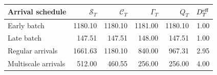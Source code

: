 \begin{tabular}{lrrrrr}
\toprule
Arrival schedule & $\mathscr S_T$ & $\mathscr C_T$ & $\Gamma_T$ & $Q_T$ & $D_T^{\rm eff}$ \\
\midrule
Early batch & 1180.10 & 1180.10 & 1181.00 & 1180.10 & 1.00 \\
Late batch & 147.51 & 147.51 & 148.00 & 147.51 & 1.00 \\
Regular arrivals & 1661.63 & 1180.10 & 840.00 & 967.31 & 2.95 \\
Multiscale arrivals & 512.00 & 460.55 & 256.00 & 256.00 & 4.00 \\
\bottomrule
\end{tabular}
